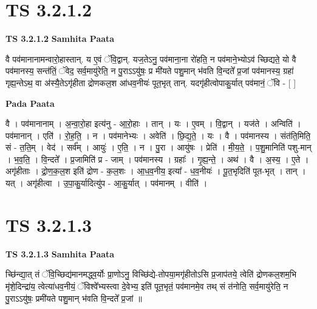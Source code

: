 \documentclass[17pt]{extarticle}
\begin{document}
\section*{ TS 3.2.1.2 }

\textbf{TS 3.2.1.2 } \newline
\textbf{Samhita Paata} \newline

वै पव॑मानानामन्वारो॒हास्तान्. य ए॒वं ॅवि॒द्वान्. यज॒तेऽनु॒ पव॑माना॒ना रो॑हति॒ न पव॑माने॒भ्योऽव॑ च्छिद्यते॒ यो वै पव॑मानस्य॒ सन्त॑तिं॒ ॅवेद॒ सर्व॒मायु॑रेति॒ न पु॒राऽऽयु॑षः॒ प्र मी॑यते पशु॒मान् भ॑वति वि॒न्दते᳚ प्र॒जां पव॑मानस्य॒ ग्रहा॑ गृह्य॒न्तेऽथ॒ वा अ॑स्यै॒तेऽगृ॑हीता द्रोणकल॒श आ॑धव॒नीयः॑ पूत॒भृत् तान्. यदगृ॑हीत्वोपाकु॒र्यात् पव॑मानं॒ ॅवि - [  ] \newline

\textbf{Pada Paata} \newline

वै । पव॑मानानाम् । अ॒न्वा॒रो॒हा इत्य॑नु - आ॒रो॒हाः । तान् । यः । ए॒वम् । वि॒द्वान् । यज॑ते । अन्विति॑ । पव॑मानान् । एति॑ । रो॒ह॒ति॒ । न । पव॑मानेभ्यः । अवेति॑ । छि॒द्य॒ते॒ । यः । वै । पव॑मानस्य । संत॑ति॒मिति॒ सं - त॒ति॒म् । वेद॑ । सर्व᳚म् । आयुः॑ । ए॒ति॒ । न । पु॒रा । आयु॑षः । प्रेति॑ । मी॒य॒ते॒ । प॒शु॒मानिति॑ पशु-मान् । भ॒व॒ति॒ । वि॒न्दते᳚ । प्र॒जामिति॑ प्र - जाम् । पव॑मानस्य । ग्रहाः᳚ । गृ॒ह्य॒न्ते॒ । अथ॑ । वै । अ॒स्य॒ । ए॒ते । अगृ॑हीताः । द्रो॒ण॒क॒ल॒श इति॑ द्रोण - क॒ल॒शः । आ॒ध॒व॒नीय॒ इत्या᳚ - ध॒व॒नीयः॑ । पू॒त॒भृदिति॑ पूत-भृत् । तान् । यत् । अगृ॑हीत्वा । उ॒पा॒कु॒र्यादित्यु॑प - आ॒कु॒र्यात् । पव॑मानम् । वीति॑ ।  \newline




\section*{ TS 3.2.1.3 }

\textbf{TS 3.2.1.3 } \newline
\textbf{Samhita Paata} \newline

च्छि॑न्द्या॒त् तं ॅवि॒च्छिद्य॑मानमद्ध्व॒र्योः प्रा॒णोऽनु॒ विच्छि॑द्ये-तोपया॒मगृ॑हीतोऽसि प्र॒जाप॑तये॒ त्वेति॑ द्रोणकल॒शम॒भि मृ॑शे॒दिन्द्रा॑य॒ त्वेत्या॑धव॒नीयं॒ ॅविश्वे᳚भ्यस्त्वा दे॒वेभ्य॒ इति॑ पूत॒भृतं॒ पव॑मानमे॒व तथ् सं त॑नोति॒ सर्व॒मायु॑रेति॒ न पु॒राऽऽयु॑षः॒ प्रमी॑यते पशु॒मान् भ॑वति वि॒न्दते᳚ प्र॒जां ॥ \newline
\end{document}
